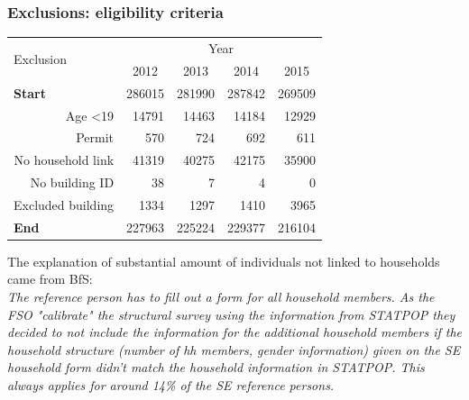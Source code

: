 \documentclass[a4paper, notitlepage, fleqn]{article} %
\begin{document}
\newpage
\subsubsection{Exclusions: eligibility criteria}

\begin{table}[!htbp]
\centering
\begin{tabular}{rrrrr}
\hline
\multicolumn{1}{l}{\multirow{2}{*}{Exclusion}} & \multicolumn{4}{c}{Year}                                                                                  \\
\multicolumn{1}{l}{}                           & \multicolumn{1}{c}{2012} & \multicolumn{1}{c}{2013} & \multicolumn{1}{c}{2014} & \multicolumn{1}{c}{2015} \\
\hline
\multicolumn{1}{l}{\textbf{Start}}             & 286015               & 281990               & 287842               & 269509               \\
\quad Age \textless 19				           & 14791                 & 14463                 & 14184                 & 12929                 \\
\quad Permit      					           & 570                 & 724                 & 692                 & 611                 \\
\quad No household link				           & 41319                 & 40275                 & 42175                 & 35900                 \\
\quad No building ID 					       & 38                 & 7                 & 4                 & 0                 \\
\quad Excluded building 				       & 1334                 & 1297                 & 1410                 & 3965                 \\
\hline
\multicolumn{1}{l}{\textbf{End}}               & 227963                 & 225224                 & 229377                 & 216104                 \\
\hline
\end{tabular}
\end{table}

The explanation of substantial amount of individuals not linked to households came from BfS: \\

\emph{The reference person has to fill out a form for all household members. As the FSO "calibrate" the structural survey using the information from STATPOP they decided to not include the information for the additional household members if the household structure (number of hh members, gender information) given on the SE household form didn’t match the household information in STATPOP. This always applies for around 14\% of the SE reference persons.} \\ 
\end{document}
